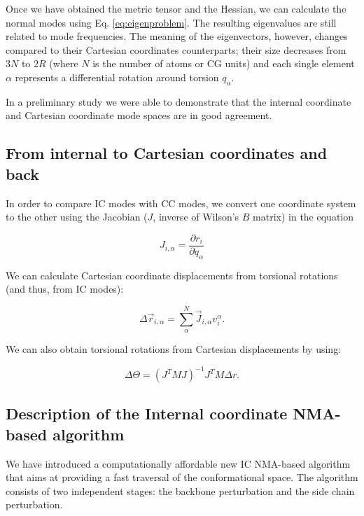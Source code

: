 Once we have obtained the metric tensor and the Hessian, we can calculate the normal modes using Eq. \ref{eq:eigenproblem}. The resulting eigenvalues are still related to mode frequencies. The meaning of the eigenvectors, however, changes compared to their Cartesian coordinates counterparts; their size decreases from $3N$ to \around$2R$ (where $N$ is the number of atoms or CG units) and each single element $\alpha$ represents a differential rotation around torsion $q_\alpha$. 

In a preliminary study \cite{rincon_munoz_alisis_2014} we were able to demonstrate that the internal coordinate and Cartesian coordinate mode spaces are in good agreement.

\subsection{From internal to Cartesian coordinates and back} 

In order to compare IC modes with CC modes, we convert one coordinate system to the other using the Jacobian ($J$, inverse of Wilson's $B$ matrix) in the equation

\begin{equation}
J_{i,\alpha} = \frac{\partial r_i}{\partial q_\alpha}
\end{equation}

We can calculate Cartesian coordinate displacements from torsional rotations (and thus, from IC modes):

\begin{equation}
\Delta \vec{r}_{i,\alpha} = \sum_{\alpha}^N \vec{J}_{i,\alpha} v_i^\alpha  .
\end{equation}

We can also obtain torsional rotations from Cartesian displacements by using:

\begin{equation}
\Delta \Theta = (J^T M J)^{-1} J^T M \Delta r .
\end{equation}

\subsection{Description of the Internal coordinate NMA-based algorithm}
We have introduced a computationally affordable new IC NMA-based algorithm that aims at providing a fast traversal of the conformational space. The algorithm consists of two independent stages: the backbone perturbation and the side chain perturbation.

